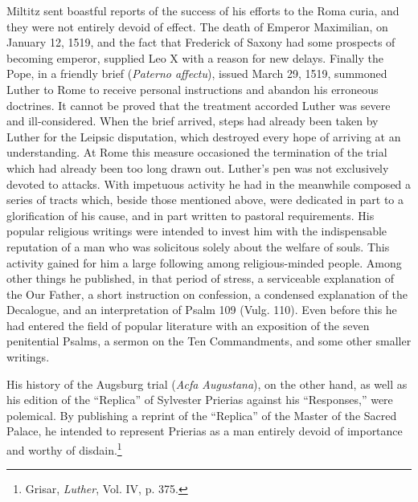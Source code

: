 Miltitz sent boastful reports of the success of his efforts to the
Roma curia, and they were not entirely devoid of effect. The death
of Emperor Maximilian, on January 12, 1519, and the fact that
Frederick of Saxony had some prospects of becoming emperor, supplied Leo
X with a reason for new delays. Finally the Pope, in a friendly
brief (\textit{Paterno affectu}), issued March 29, 1519, summoned Luther
to Rome to receive personal instructions and abandon his erroneous
doctrines. It cannot be proved that the treatment accorded Luther
was severe and ill-considered. When the brief arrived, steps had already
been taken by Luther for the Leipsic disputation, which destroyed every
hope of arriving at an understanding. At Rome this
measure occasioned the termination of the trial which had already
been too long drawn out.
Luther’s pen was not exclusively devoted to attacks. With impetuous activity
he had in the meanwhile composed a series of tracts
which, beside those mentioned above, were dedicated in part to a
glorification of his cause, and in part written to pastoral requirements.
His popular religious writings were intended to invest him
with the indispensable reputation of a man who was solicitous solely
about the welfare of souls. This activity gained for him a large following
among religious-minded people. Among other things he published,
in that period of stress, a serviceable explanation of the Our Father, a
short instruction on confession, a condensed explanation of the
Decalogue, and an interpretation of Psalm 109 (Vulg. 110). Even %
before this he had entered the field of popular literature with an
exposition of the seven penitential Psalms, a sermon on the Ten Commandments,
and some other smaller writings.

His history of the Augsburg trial (\textit{Acfa Augustana}), on the other
hand, as well as his edition of the “Replica” of Sylvester Prierias
against his “Responses,” were polemical. By publishing a reprint of
the “Replica” of the Master of the Sacred Palace, he intended to
represent Prierias as a man entirely devoid of importance and worthy
of disdain.\footnote{Grisar, \textit{Luther}, Vol. IV, p. 375.}

